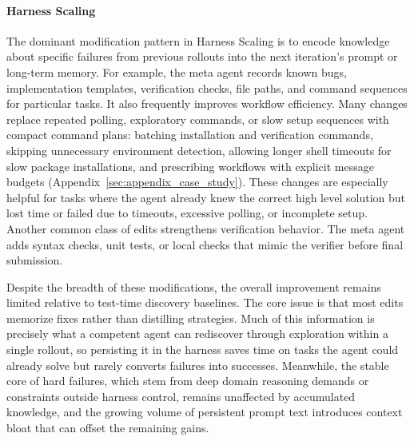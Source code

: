 \documentclass{article}
\begin{document}
\paragraph{Harness Scaling} 
The dominant modification pattern in Harness Scaling is to encode knowledge about specific failures from previous rollouts into the next iteration's prompt or long-term memory. For example, the meta agent records known bugs, implementation templates, verification checks, file paths, and command sequences for particular tasks. It also frequently improves workflow efficiency. Many changes replace repeated polling, exploratory commands, or slow setup sequences with compact command plans: batching installation and verification commands, skipping unnecessary environment detection, allowing longer shell timeouts for slow package installations, and prescribing workflows with explicit message budgets (Appendix~\ref{sec:appendix_case_study}). These changes are especially helpful for tasks where the agent already knew the correct high level solution but lost time or failed due to timeouts, excessive polling, or incomplete setup. Another common class of edits strengthens verification behavior. The meta agent adds syntax checks, unit tests, or local checks that mimic the verifier before final submission. 

Despite the breadth of these modifications, the overall improvement remains limited relative to test-time discovery baselines. The core issue is that most edits memorize fixes rather than distilling strategies. Much of this information is precisely what a competent agent can rediscover through exploration within a single rollout, so persisting it in the harness saves time on tasks the agent could already solve but rarely converts failures into successes. Meanwhile, the stable core of hard failures, which stem from deep domain reasoning demands or constraints outside harness control, remains unaffected by accumulated knowledge, and the growing volume of persistent prompt text introduces context bloat that can offset the remaining gains.


\end{document}
